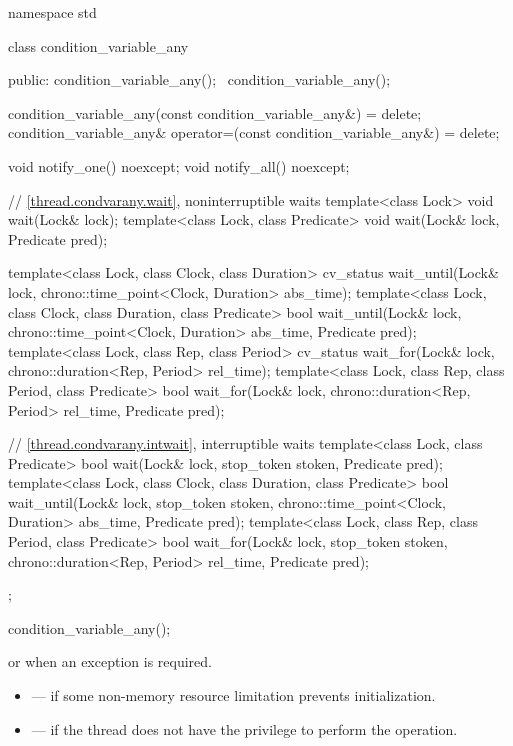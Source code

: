 %
\begin{codeblock}
namespace std {
  class condition_variable_any {
  public:
    condition_variable_any();
    ~condition_variable_any();

    condition_variable_any(const condition_variable_any&) = delete;
    condition_variable_any& operator=(const condition_variable_any&) = delete;

    void notify_one() noexcept;
    void notify_all() noexcept;

    // \ref{thread.condvarany.wait}, noninterruptible waits
    template<class Lock>
      void wait(Lock& lock);
    template<class Lock, class Predicate>
      void wait(Lock& lock, Predicate pred);

    template<class Lock, class Clock, class Duration>
      cv_status wait_until(Lock& lock, chrono::time_point<Clock, Duration> abs_time);
    template<class Lock, class Clock, class Duration, class Predicate>
      bool wait_until(Lock& lock, chrono::time_point<Clock, Duration> abs_time,
                      Predicate pred);
    template<class Lock, class Rep, class Period>
      cv_status wait_for(Lock& lock, chrono::duration<Rep, Period> rel_time);
    template<class Lock, class Rep, class Period, class Predicate>
      bool wait_for(Lock& lock, chrono::duration<Rep, Period> rel_time, Predicate pred);

    // \ref{thread.condvarany.intwait}, interruptible waits
    template<class Lock, class Predicate>
      bool wait(Lock& lock, stop_token stoken, Predicate pred);
    template<class Lock, class Clock, class Duration, class Predicate>
      bool wait_until(Lock& lock, stop_token stoken,
                      chrono::time_point<Clock, Duration> abs_time, Predicate pred);
    template<class Lock, class Rep, class Period, class Predicate>
      bool wait_for(Lock& lock, stop_token stoken,
                    chrono::duration<Rep, Period> rel_time, Predicate pred);
  };
}
\end{codeblock}

%
\begin{itemdecl}
condition_variable_any();
\end{itemdecl}

\begin{itemdescr}
\pnum
\throws
{} or  when an exception is
required.

\pnum
\errors
\begin{itemize}
\item {} --- if some non-memory resource
limitation prevents initialization.

\item {} --- if the thread does not have the
privilege to perform the operation.
\end{itemize}
\end{itemdescr}

